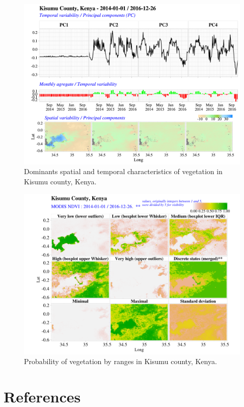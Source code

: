 \documentclass[12pt,oneside]{article}
\begin{document}
\begin{figure}
\includegraphics[width=1\linewidth]{figures/Mapping_FBFS_NDVI_PCA_plot_Kisumu} \caption{Dominants spatial and temporal characteristics of vegetation in Kisumu county, Kenya.}\label{fig:fig9}
\end{figure}

\begin{figure}
\includegraphics[width=1\linewidth]{figures/Mapping_FBFS_vegetation_probability} \caption{Probability of vegetation by ranges in Kisumu county, Kenya.}\label{fig:fig10}
\end{figure}

\clearpage

\hypertarget{references}{%
\section*{References}\label{references}}
\end{document}
